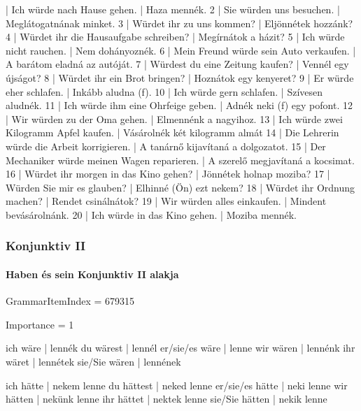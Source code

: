 \documentclass{article}
\newenvironment{desc}{\verbatim}{\endverbatim}
\newenvironment{exmp}{\verbatim}{\endverbatim}
\begin{document}
\begin{exmp}
1 | Ich würde nach Hause gehen. | Haza mennék.
2 | Sie würden uns besuchen. | Meglátogatnának minket.
3 | Würdet ihr zu uns kommen? | Eljönnétek hozzánk?
4 | Würdet ihr die Hausaufgabe schreiben? | Megírnátok a házit?
5 | Ich würde nicht rauchen. | Nem dohányoznék.
6 | Mein Freund würde sein Auto verkaufen. | A barátom eladná az autóját.
7 | Würdest du eine Zeitung kaufen? | Vennél egy újságot?
8 | Würdet ihr ein Brot bringen? | Hoznátok egy kenyeret?
9 | Er würde eher schlafen. | Inkább aludna (f).
10 | Ich würde gern schlafen. | Szívesen aludnék.
11 | Ich würde ihm eine Ohrfeige geben. | Adnék neki (f) egy pofont.
12 | Wir würden zu der Oma gehen. | Elmennénk a nagyihoz.
13 | Ich würde zwei Kilogramm Apfel kaufen. | Vásárolnék két kilogramm almát
14 | Die Lehrerin würde die Arbeit korrigieren. | A tanárnő kijavítaná a dolgozatot.
15 | Der Mechaniker würde meinen Wagen reparieren. | A szerelő megjavítaná a kocsimat.
16 | Würdet ihr morgen in das Kino gehen? | Jönnétek holnap moziba?
17 | Würden Sie mir es glauben? | Elhinné (Ön) ezt nekem?
18 | Würdet ihr Ordnung machen? | Rendet csinálnátok?
19 | Wir würden alles einkaufen. | Mindent bevásárolnánk.
20 | Ich würde in das Kino gehen. | Moziba mennék.
\end{exmp}

\subsubsection{Konjunktiv II}

\paragraph{Haben és sein Konjunktiv II alakja}

GrammarItemIndex = 679315

Importance = 1

\begin{desc}
ich wäre       | lennék
du wärest      | lennél
er/sie/es wäre | lenne
wir wären      | lennénk
ihr wäret      | lennétek
sie/Sie wären  | lennének

ich hätte       | nekem lenne
du hättest      | neked lenne
er/sie/es hätte | neki lenne
wir hätten      | nekünk lenne
ihr hättet      | nektek lenne
sie/Sie hätten  | nekik lenne
\end{desc}
\end{document}

